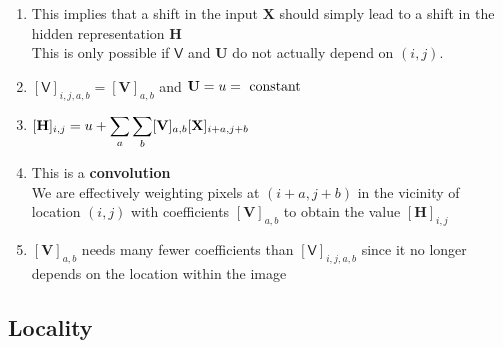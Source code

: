\begin{enumerate}[itemsep=0.2cm]
    \item This implies that a shift in the input $\mathbf{X}$ should simply lead to a shift in the hidden representation $\mathbf{H}$\\
    This is only possible if $\mathsf{V}$ and $\mathbf{U}$ do not actually depend on $(i, j)$.

    \item[] $[\mathsf{V}]_{i, j, a, b} = [\mathbf{V}]_{a, b}$ 
    \hfill and \hfill
    $\mathbf{U} = u = \text{ constant} \hfill$ 

    \item[] 
    $
        \hfill
        [\mathbf{H}]_{i, j} 
        = u + \dsum_a\dsum_b [\mathbf{V}]_{a, b}  [\mathbf{X}]_{i+a, j+b}
        \hfill
    $

    \item This is a \textbf{convolution}\\
    We are effectively weighting pixels at $(i+a, j+b)$ in the vicinity of location $(i, j)$ with coefficients $[\mathbf{V}]_{a, b}$ to obtain the value $[\mathbf{H}]_{i, j}$

    \item $[\mathbf{V}]_{a, b}$ needs many fewer coefficients than $[\mathsf{V}]_{i, j, a, b}$ since it no longer depends on the location within the image

\end{enumerate}


\subsection{Locality \cite{dnn-1}}

